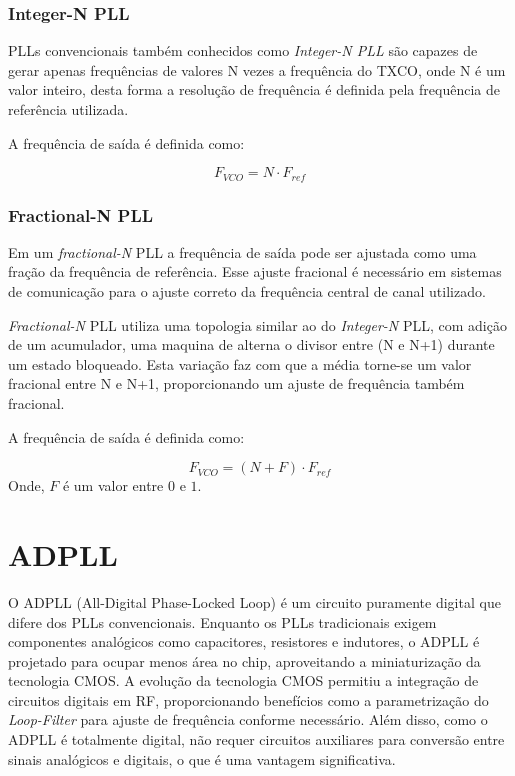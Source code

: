 \subsubsection{Integer-N PLL}

PLLs convencionais também conhecidos como \textit{Integer-N PLL} são capazes de gerar apenas frequências de valores N vezes a frequência do TXCO, onde N é um valor inteiro, desta forma a resolução de frequência é definida pela frequência de referência utilizada. 

A frequência de saída é definida como:

\begin{equation}
	F_{VCO} = N \cdot F_{ref}
	\label{eq:fvco_integer_PLL}
\end{equation}



\subsubsection{Fractional-N PLL }
Em um \textit{fractional-N} PLL a frequência de saída pode ser ajustada como uma fração da frequência de referência. Esse ajuste fracional é necessário em sistemas de comunicação para o ajuste correto da frequência central de canal utilizado. 

\textit{Fractional-N} PLL utiliza uma topologia similar ao do \textit{Integer-N} PLL, com adição de um acumulador, uma maquina de alterna o divisor entre (N e N+1) durante um estado bloqueado. Esta variação faz com que a média torne-se um valor fracional entre N e N+1, proporcionando um ajuste de frequência também fracional. 

A frequência de saída é definida como:

\begin{equation}
	F_{VCO} = (N + F) \cdot F_{ref}
	\label{eq:fvco_fractional_PLL}
\end{equation}
Onde, $F$ é um valor entre $0$ e $1$. 

\section{ADPLL}
O ADPLL (All-Digital Phase-Locked Loop) é um circuito puramente digital que difere dos PLLs convencionais. Enquanto os PLLs tradicionais exigem componentes analógicos como capacitores, resistores e indutores, o ADPLL é projetado para ocupar menos área no chip, aproveitando a miniaturização da tecnologia CMOS. A evolução da tecnologia CMOS permitiu a integração de circuitos digitais em RF, proporcionando benefícios como a parametrização do \textit{Loop-Filter} para ajuste de frequência conforme necessário. Além disso, como o ADPLL é totalmente digital, não requer circuitos auxiliares para conversão entre sinais analógicos e digitais, o que é uma vantagem significativa.

